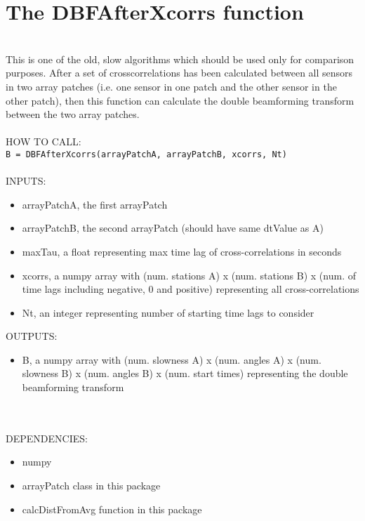 \documentclass{article}
\begin{document}
\section{The DBFAfterXcorrs function}
\\
This is one of the old, slow algorithms which should be used only for comparison purposes. After a set of crosscorrelations has been calculated between all sensors in two array patches (i.e. one sensor in one patch and the other sensor in the other patch), then this function can calculate the double beamforming transform between the two array patches. 
\\
\\
HOW TO CALL:
\\
\texttt{B = DBFAfterXcorrs(arrayPatchA, arrayPatchB, xcorrs, Nt)}
\\
\\
INPUTS: 
\begin{itemize}
\item arrayPatchA, the first arrayPatch
\item arrayPatchB, the second arrayPatch (should have same dtValue as A)
\item maxTau, a float representing max time lag of cross-correlations in seconds
\item xcorrs, a numpy array with (num. stations A) x (num. stations B) x (num. of time lags including negative, 0 and positive) representing all cross-correlations
\item Nt, an integer representing number of starting time lags to consider
\end{itemize} 
OUTPUTS:
\begin{itemize}
    \item B, a numpy array with (num. slowness A) x (num. angles A) x (num. slowness B) x (num. angles B) x (num. start times) representing the double beamforming transform
\end{itemize} 
\\
\\
DEPENDENCIES:
\begin{itemize}
    \item numpy
    \item arrayPatch class in this package
    \item calcDistFromAvg function in this package
\end{itemize}
\\
\\
\end{document}
